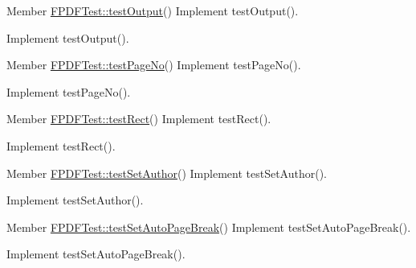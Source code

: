 \label{todo__todo000197}
\hypertarget{todo__todo000197}{}
 
\begin{DoxyDescription}
\item[Member \hyperlink{class_f_p_d_f_test_a586f5a4dbe45e0768ba5de87f8eb2ee7}{FPDFTest::testOutput}() ]Implement testOutput().

Implement testOutput().
\end{DoxyDescription}

\label{todo__todo000171}
\hypertarget{todo__todo000171}{}
 
\begin{DoxyDescription}
\item[Member \hyperlink{class_f_p_d_f_test_a17eedcf2cff8ca7679f512b54ce939bc}{FPDFTest::testPageNo}() ]Implement testPageNo().

Implement testPageNo().
\end{DoxyDescription}

\label{todo__todo000178}
\hypertarget{todo__todo000178}{}
 
\begin{DoxyDescription}
\item[Member \hyperlink{class_f_p_d_f_test_a1d7b051b0fc343e9aea5c7add0f50079}{FPDFTest::testRect}() ]Implement testRect().

Implement testRect().
\end{DoxyDescription}

\label{todo__todo000161}
\hypertarget{todo__todo000161}{}
 
\begin{DoxyDescription}
\item[Member \hyperlink{class_f_p_d_f_test_a994fab439102f0b00d4e6338f8f43338}{FPDFTest::testSetAuthor}() ]Implement testSetAuthor().

Implement testSetAuthor().
\end{DoxyDescription}

\label{todo__todo000156}
\hypertarget{todo__todo000156}{}
 
\begin{DoxyDescription}
\item[Member \hyperlink{class_f_p_d_f_test_a538458c657bb68bc14fa0867fb5f26d2}{FPDFTest::testSetAutoPageBreak}() ]Implement testSetAutoPageBreak().

Implement testSetAutoPageBreak().
\end{DoxyDescription}

\label{todo__todo000158}
\hypertarget{todo__todo000158}{}
 
